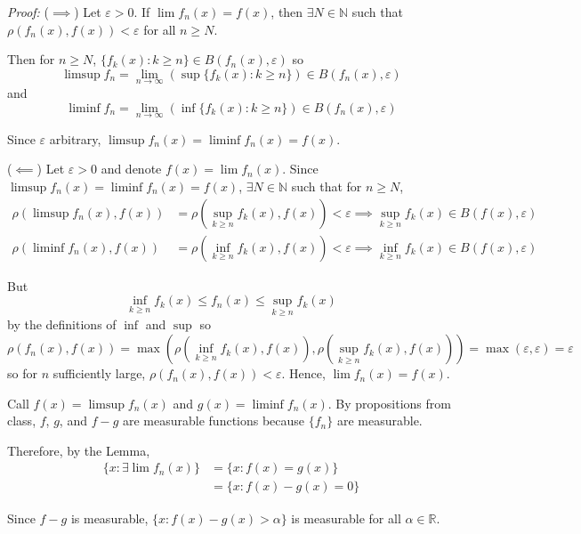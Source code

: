 \documentclass[12pt]{article}
\newcommand{\R}{\mathbb{R}}
\newcommand{\N}{\mathbb{N}}
\newcommand{\ep}{\varepsilon}
\newenvironment*{proof}[1][blue]{
    \begin{tcolorbox}[
    parbox=false,
        colback=#1!5!white,
        colframe=#1!75!black,
        coltext=#1,
        breakable
    ]}
    {\end{tcolorbox}}
\begin{document}
        \begin{proof}
            \emph{Proof:} ($\implies$) Let $\ep > 0$. If $\lim f_n(x) = f(x)$, then $\exists N \in \N$ such that $\rho(f_n(x), f(x)) < \ep$ for all $n \geq N$. 
            
            Then for $n \geq N$, $\{f_k(x): k \geq n\} \in B(f_n(x), \ep)$ so 
            \[\limsup f_n = \lim_{n \to \infty} (\sup \{f_k(x): k \geq n\}) \in B(f_n(x), \ep)\]
            and 
            \[\liminf f_n = \lim_{n \to \infty} (\inf \{f_k(x): k \geq n\}) \in B(f_n(x), \ep)\]

            Since $\ep$ arbitrary, $\limsup f_n(x) = \liminf f_n(x) = f(x)$.
        
            ($\impliedby$) Let $\ep > 0$ and denote $f(x) = \lim f_n(x)$. Since $\limsup f_n(x) = \liminf f_n(x) = f(x)$, $\exists N \in \N$ such that for $n \geq N$, 
            \begin{align*}
                \rho(\limsup f_n(x), f(x)) &= \rho(\sup_{k \geq n} f_k(x), f(x)) < \ep \implies \sup_{k \geq n} f_k(x) \in B(f(x), \ep)\\ 
                \rho(\liminf f_n(x), f(x)) &= \rho(\inf_{k \geq n} f_k(x), f(x)) < \ep \implies \inf_{k \geq n} f_k(x) \in B(f(x), \ep)
            \end{align*}

            But 
            \[\inf_{k \geq n} f_k(x) \leq f_n(x) \leq \sup_{k \geq n} f_k(x)\]
            by the definitions of $\inf$ and $\sup$ so 
            \[\rho(f_n(x), f(x)) = \max\left(\rho(\inf_{k \geq n} f_k(x), f(x)), \rho(\sup_{k \geq n} f_k(x), f(x))\right) = \max(\ep, \ep) = \ep\]
            so for $n$ sufficiently large, $\rho(f_n(x), f(x)) < \ep$. Hence, $\lim f_n(x) = f(x)$.
        \end{proof} 

        Call $f(x) = \limsup f_n(x)$ and $g(x) = \liminf f_n(x)$. By propositions from class, $f$, $g$, and $f - g$ are measurable functions because $\{f_n\}$ are measurable. 
        
        Therefore, by the Lemma,
        \begin{align*}
            \{x: \exists \lim f_n(x)\} &= \{x: f(x) = g(x)\} \\
            &= \{x: f(x) - g(x) = 0\}
        \end{align*}

        Since $f - g$ is measurable, $\{x: f(x) - g(x) > \alpha\}$ is measurable for all $\alpha \in \R$. 
        
\end{document}
